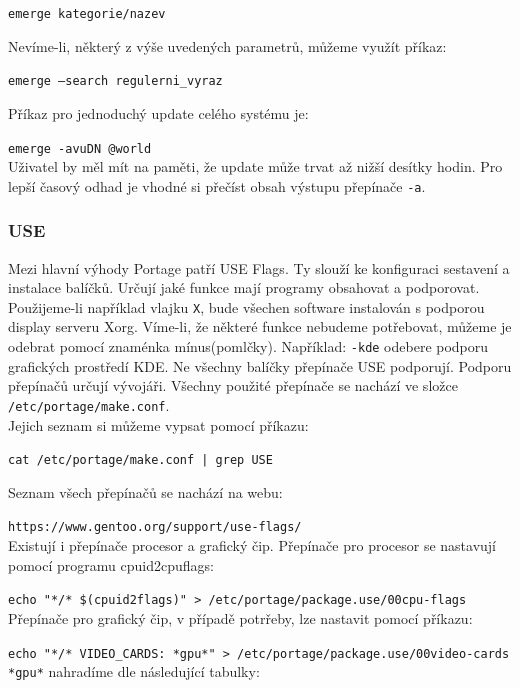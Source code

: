 \documentclass[12pt,a4paper,twoside,]{article}
\begin{document}
{ \texttt{emerge kategorie/nazev} 
 
Nevíme-li, některý z výše uvedených parametrů, můžeme využít příkaz:

\texttt{emerge --search regulerni\_vyraz} 

Příkaz pro jednoduchý update celého systému je:

\texttt{emerge -avuDN @world}\\

Uživatel by měl mít na paměti, že update může trvat až nižší desítky hodin. Pro lepší časový odhad je vhodné si přečíst obsah výstupu přepínače \texttt{-a}. %
\newpage
\subsubsection{\textsf{USE}}
Mezi hlavní výhody Portage patří USE Flags. Ty slouží ke konfiguraci sestavení a instalace balíčků. Určují jaké funkce mají programy obsahovat a podporovat.\\
Použijeme-li například vlajku \texttt{X}, bude všechen software instalován s podporou display serveru Xorg. Víme-li, že některé funkce nebudeme potřebovat, můžeme je odebrat pomocí znaménka mínus(pomlčky). Například: \texttt{-kde} odebere podporu grafických prostředí KDE.
Ne všechny balíčky přepínače USE podporují. Podporu přepínačů určují vývojáři.
Všechny použité přepínače se nachází ve složce \texttt{/etc/portage/make.conf}. \\
Jejich seznam si můžeme vypsat pomocí příkazu:

\texttt{cat /etc/portage/make.conf | grep USE}

Seznam všech přepínačů se nachází na webu:

\texttt{https://www.gentoo.org/support/use-flags/}\\

Existují i přepínače procesor a grafický čip. Přepínače pro procesor se nastavují pomocí programu cpuid2cpuflags:


\texttt{echo "*/* \$(cpuid2flags)" > /etc/portage/package.use/00cpu-flags}\\

Přepínače pro grafický čip, v případě potrřeby, lze nastavit pomocí příkazu:

\texttt{echo "*/* VIDEO\_CARDS: *gpu*" > /etc/portage/package.use/00video-cards}\\

\texttt{*gpu*} nahradíme dle následující tabulky:

}
\end{document}
